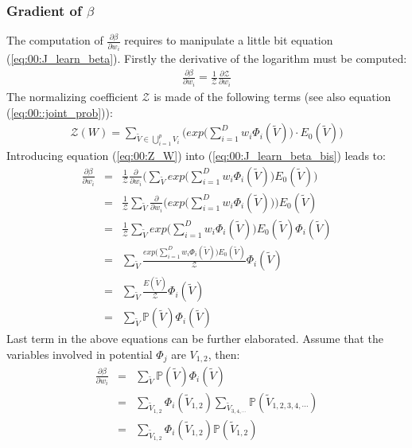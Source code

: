 \subsubsection{Gradient of $\beta$}
\label{sec:00:beta_unc}

The computation of $\frac{\partial \beta}{\partial w_i}$ requires to manipulate a little bit equation (\ref{eq:00:J_learn_beta}).
Firstly the derivative of the logarithm must be computed:
\begin{eqnarray}
\frac{\partial \beta}{\partial w_i} = \frac{1}{\mathcal{Z}} \frac{\partial \mathcal{Z}}{\partial w_i}
\label{eq:00:J_learn_beta_bis}
\end{eqnarray}
The normalizing coefficient $\mathcal{Z}$ is made of the following terms (see also equation (\ref{eq:00::joint_prob})):
\begin{eqnarray}
\mathcal{Z}(W) = \sum _{ \tilde{V} \in \bigcup_{i=1}^{p} V_i } \bigg( exp \big( \sum _{i=1} ^{D} w_i \Phi _i(\tilde{V}) \big ) \cdot E_0(\tilde{V}) \bigg) 
\label{eq:00:Z_W}
\end{eqnarray} 
Introducing equation (\ref{eq:00:Z_W}) into (\ref{eq:00:J_learn_beta_bis}) leads to:
\begin{eqnarray}
\frac{\partial \beta}{\partial w_i} 
&=& \frac{1}{\mathcal{Z}} \frac{\partial }{\partial w_i} \bigg( \sum_{\tilde{V}} 
exp \big( \sum_{i=1}^{D} w_i \Phi_i(\tilde{V})  \big) E_0(\tilde{V})  \bigg)  \nonumber\\
&=& \frac{1}{\mathcal{Z}}  \sum_{\tilde{V}} \frac{\partial }{\partial w_i} \bigg( 
exp \big( \sum_{i=1}^{D} w_i \Phi_i(\tilde{V})  \big)\bigg) E_0(\tilde{V})   \nonumber\\
&=& \frac{1}{\mathcal{Z}}  \sum_{\tilde{V}}  
exp \big( \sum_{i=1}^{D} w_i \Phi_i(\tilde{V})  \big)  E_0(\tilde{V}) \Phi_i(\tilde{V})   \nonumber\\
&=&  \sum_{\tilde{V}}  \frac{exp \big( \sum_{i=1}^{D} w_i \Phi_i(\tilde{V})  \big)  E_0(\tilde{V})}{\mathcal{Z}} \Phi_i(\tilde{V})   \nonumber\\ 
&=& \sum_{\tilde{V}}\frac{E(\tilde{V})}{\mathcal{Z}}\Phi_i(\tilde{V}) \nonumber\\
&=& \sum _{  \tilde{V} } \mathbb{P}(\tilde{V}) \Phi _i(\tilde{V})
\end{eqnarray}
Last term in the above equations can be further elaborated. Assume that the variables involved in potential $\Phi _j$ are $V_{1,2}$, then:
\begin{eqnarray}
\frac{\partial \beta}{\partial w_i} &=& \sum _{  \tilde{V} } \mathbb{P}(\tilde{V}) \Phi _i(\tilde{V}) \nonumber\\
&=& \sum _{  \tilde{V}_{1,2} } \Phi _i(\tilde{V}_{1,2}) \sum _{  \tilde{V}_{3,4,\cdots}  } \mathbb{P}(\tilde{V}_{1,2,3,4,\cdots})  \nonumber\\
&=& \sum _{  \tilde{V}_{1,2} } \Phi _i(\tilde{V}_{1,2}) \mathbb{P}(\tilde{V}_{1,2})
\end{eqnarray}

